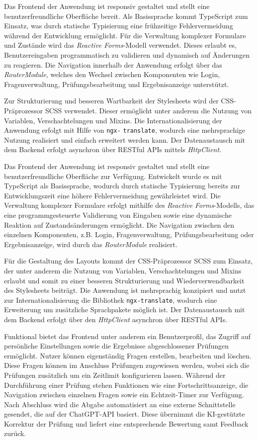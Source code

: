 \documentclass[a4paper,12pt]{article}
\begin{document}
Das Frontend der Anwendung ist responsiv gestaltet und stellt eine benutzerfreundliche Oberfläche bereit. Als Basissprache kommt TypeScript zum Einsatz, was durch statische Typisierung eine frühzeitige Fehlervermeidung während der Entwicklung ermöglicht. Für die Verwaltung komplexer Formulare und Zustände wird das \textit{Reactive Forms}-Modell verwendet. Dieses erlaubt es, Benutzereingaben programmatisch zu validieren und dynamisch auf Änderungen zu reagieren. Die Navigation innerhalb der Anwendung erfolgt über das \textit{RouterModule}, welches den Wechsel zwischen Komponenten wie Login, Fragenverwaltung, Prüfungsbearbeitung und Ergebnisanzeige unterstützt.

Zur Strukturierung und besseren Wartbarkeit der Stylesheets wird der CSS-Präprozessor SCSS verwendet. Dieser ermöglicht unter anderem die Nutzung von Variablen, Verschachtelungen und Mixins. Die Internationalisierung der Anwendung erfolgt mit Hilfe von \texttt{ngx-} \texttt{translate}, wodurch eine mehrsprachige Nutzung realisiert und einfach erweitert werden kann. Der Datenaustausch mit dem Backend erfolgt asynchron über RESTful APIs mittels \textit{HttpClient}.

Das Frontend der Anwendung ist responsiv gestaltet und stellt eine benutzerfreundliche Oberfläche zur Verfügung. Entwickelt wurde es mit TypeScript als Basissprache, wodurch durch statische Typisierung bereits zur Entwicklungszeit eine höhere Fehlervermeidung gewährleistet wird. Die Verwaltung komplexer Formulare erfolgt mithilfe des \textit{Reactive Forms}-Modells, das eine programmgesteuerte Validierung von Eingaben sowie eine dynamische Reaktion auf Zustandsänderungen ermöglicht. Die Navigation zwischen den einzelnen Komponenten, z.B. Login, Fragenverwaltung, Prüfungsbearbeitung oder Ergebnisanzeige, wird durch das \textit{RouterModule} realisiert.

Für die Gestaltung des Layouts kommt der CSS-Präprozessor SCSS zum Einsatz, der unter anderem die Nutzung von Variablen, Verschachtelungen und Mixins erlaubt und somit zu einer besseren Strukturierung und Wiederverwendbarkeit des Stylesheets beiträgt. Die Anwendung ist mehrsprachig konzipiert und nutzt zur Internationalisierung die Bibliothek \texttt{ngx-translate}, wodurch eine Erweiterung um zusätzliche Sprachpakete möglich ist. Der Datenaustausch mit dem Backend erfolgt über den \textit{HttpClient} asynchron über RESTful APIs.

Funktional bietet das Frontend unter anderem ein Benutzerprofil, das Zugriff auf persönliche Einstellungen sowie die Ergebnisse abgeschlossener Prüfungen ermöglicht. Nutzer können eigenständig Fragen erstellen, bearbeiten und löschen. Diese Fragen können im Anschluss Prüfungen zugewiesen werden, wobei sich die Prüfungen zusätzlich um ein Zeitlimit konfigurieren lassen. Während der Durchführung einer Prüfung stehen Funktionen wie eine Fortschrittsanzeige, die Navigation zwischen einzelnen Fragen sowie ein Echtzeit-Timer zur Verfügung. Nach Abschluss wird die Abgabe automatisiert an eine externe Schnittstelle gesendet, die auf der ChatGPT-API basiert. Diese übernimmt die KI-gestützte Korrektur der Prüfung und liefert eine entsprechende Bewertung samt Feedback zurück.
\end{document}
